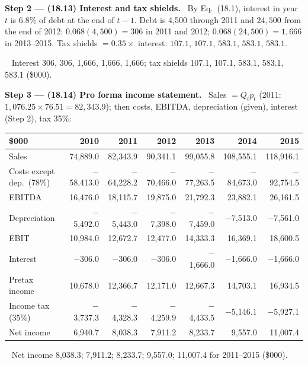 \documentclass[11pt,a4paper]{article}
\newcommand{\step}[2]{\par\medskip\noindent\textbf{Step #1 --- #2.}~}
\newcommand{\answer}[1]{\par\smallskip\noindent\fbox{\textbf{Answer #1.}}~}
\begin{document}
\step{2}{(18.13) Interest and tax shields} By Eq.~(18.1), interest in year $t$ is $6.8\%$ of debt at the
end of $t-1$. Debt is 4,500 through 2011 and $24{,}500$ from the end of 2012:
$0.068(4{,}500)=306$ in 2011 and 2012; $0.068(24{,}500)=1{,}666$ in 2013--2015. Tax shields
$=0.35\times$ interest: $107.1$, $107.1$, $583.1$, $583.1$, $583.1$.
\answer{(18.13)} Interest 306, 306, 1,666, 1,666, 1,666; tax shields 107.1, 107.1, 583.1, 583.1, 583.1 (\$000).

\step{3}{(18.14) Pro forma income statement} Sales $=Q_t p_t$ (2011: $1{,}076.25\times76.51=82{,}343.9$);
then costs, EBITDA, depreciation (given), interest (Step 2), tax 35\%:
\begin{center}\small
\begin{tabular}{lrrrrrr}
\toprule
\$000 & 2010 & 2011 & 2012 & 2013 & 2014 & 2015\\
\midrule
Sales & 74,889.0 & 82,343.9 & 90,341.1 & 99,055.8 & 108,555.1 & 118,916.1\\
Costs except dep.\ (78\%) & $-$58,413.0 & $-$64,228.2 & $-$70,466.0 & $-$77,263.5 & $-$84,673.0 & $-$92,754.5\\
EBITDA & 16,476.0 & 18,115.7 & 19,875.0 & 21,792.3 & 23,882.1 & 26,161.5\\
Depreciation & $-$5,492.0 & $-$5,443.0 & $-$7,398.0 & $-$7,459.0 & $-$7,513.0 & $-$7,561.0\\
EBIT & 10,984.0 & 12,672.7 & 12,477.0 & 14,333.3 & 16,369.1 & 18,600.5\\
Interest & $-$306.0 & $-$306.0 & $-$306.0 & $-$1,666.0 & $-$1,666.0 & $-$1,666.0\\
Pretax income & 10,678.0 & 12,366.7 & 12,171.0 & 12,667.3 & 14,703.1 & 16,934.5\\
Income tax (35\%) & $-$3,737.3 & $-$4,328.3 & $-$4,259.9 & $-$4,433.5 & $-$5,146.1 & $-$5,927.1\\
Net income & 6,940.7 & 8,038.3 & 7,911.2 & 8,233.7 & 9,557.0 & 11,007.4\\
\bottomrule
\end{tabular}
\end{center}
\answer{(18.14)} Net income 8,038.3; 7,911.2; 8,233.7; 9,557.0; 11,007.4 for 2011--2015 (\$000).
\end{document}
